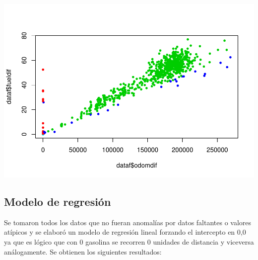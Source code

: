 \documentclass[]{article}
\newenvironment{Shaded}{\begin{snugshade}}{\end{snugshade}}
\newcommand{\KeywordTok}[1]{\textcolor[rgb]{0.13,0.29,0.53}{\textbf{#1}}}
\newcommand{\DataTypeTok}[1]{\textcolor[rgb]{0.13,0.29,0.53}{#1}}
\newcommand{\DecValTok}[1]{\textcolor[rgb]{0.00,0.00,0.81}{#1}}
\newcommand{\StringTok}[1]{\textcolor[rgb]{0.31,0.60,0.02}{#1}}
\newcommand{\OperatorTok}[1]{\textcolor[rgb]{0.81,0.36,0.00}{\textbf{#1}}}
\newcommand{\NormalTok}[1]{#1}
\begin{document}
\begin{Shaded}
\end{Shaded}

\includegraphics{practica1_files/figure-latex/unnamed-chunk-10-1.pdf}

\subsection{Modelo de regresión}\label{modelo-de-regresion}

Se tomaron todos los datos que no fueran anomalías por datos faltantes o
valores atípicos y se elaboró un modelo de regresión lineal forzando el
intercepto en 0,0 ya que es lógico que con 0 gasolina se recorren 0
unidades de distancia y viceversa análogamente. Se obtienen los
siguientes resultados:

\begin{Shaded}
\end{Shaded}
\end{document}
